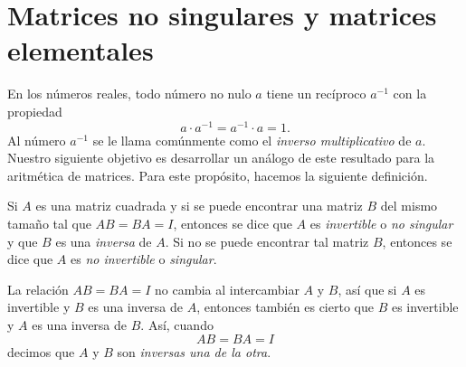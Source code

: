 \newpage

\section{Matrices no singulares y matrices elementales}

En los números reales, todo número no nulo $a$ tiene un recíproco $a^{-1}$ con la propiedad
$$a \cdot a^{-1} = a^{-1} \cdot a = 1.$$
Al número $a^{-1}$ se le llama comúnmente como el \emph{inverso multiplicativo} de $a$. Nuestro siguiente objetivo es desarrollar un análogo de este resultado para la aritmética de matrices. Para este propósito, hacemos la siguiente definición.

\begin{definicion}{}{}
    Si $A$ es una matriz cuadrada y si se puede encontrar una matriz $B$ del mismo tamaño tal que $AB = BA = I$, entonces se dice que $A$ es \emph{invertible} o \emph{no singular} y que $B$ es una \textit{inversa} de $A$. Si no se puede encontrar tal matriz $B$, entonces se dice que $A$ es \emph{no invertible} o \textit{singular}.
\end{definicion}

La relación $AB = BA = I$ no cambia al intercambiar $A$ y $B$, así que si $A$ es invertible y $B$ es una inversa de $A$, entonces también es cierto que $B$ es invertible y $A$ es una inversa de $B$. Así, cuando
$$AB = BA = I$$
decimos que $A$ y $B$ son \emph{inversas una de la otra}.

